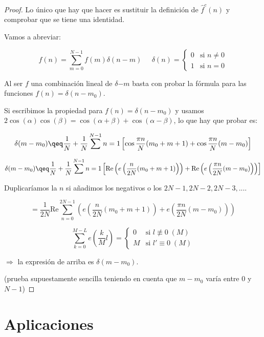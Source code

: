 	\begin{proof}
		Lo único que hay que hacer es sustituir la definición de $\hat{f}^c (n)$ y comprobar que se tiene una identidad.

		Vamos a abreviar:

		$$f(n) = \sum\limits^{N-1}_{m=0} f(m) \delta(n - m) \;\;\;\;\; \delta(n) = \begin{cases}
			0 & \mbox{si } n \neq 0 \\
			1 & \mbox{si } n = 0
		\end{cases}$$

		Al ser $f $ una combinación lineal de $\delta{-m}$ basta con probar la fórmula para las funciones $f(n) = \delta(n- m_0)$.

		Si escribimos la propiedad para $f(n) = \delta(n - m_0)$ y usamos $2 \cos{(\alpha)} \cos{(\beta)} = \cos{(\alpha + \beta)} + \cos{(\alpha - \beta)}$, lo que hay que probar es:

		$$ \delta(m - m_0) \qeq \frac{1}{N} + \frac{1}{N} \sum\limits^{N-1}{n = 1} \left[ \cos{\frac{\pi n}{N} (m_0 + m + 1)} + \cos{\frac{\pi n}{N} (m - m_0)}   \right] $$

		$$ \delta(m - m_0) \qeq \frac{1}{N} + \frac{1}{N} \sum\limits^{N-1}{n = 1} \left[ \text{Re} \left( e \left( \frac{n}{2N} (m_0 + m + 1) \right) \right) + \text{Re} \left( e \left( \frac{\pi n}{2N} (m - m_0) \right) \right)   \right] $$

		Duplicaríamos la $n$ si añadimos los negativos o los $2N-1, 2N-2, 2N-3,...$.

		$$ = \frac{1}{2N} \text{Re} \sum\limits^{2N-1}_{n=0} \left( e \left( \frac{n}{2N} (m_0 + m + 1) \right) + e \left( \frac{\pi n}{2N} (m - m_0) \right) \right) $$

		$$ \sum\limits^{M - L}_{k = 0} e \left( \frac{k}{M} l \right) = \begin{cases}
			0 & \mbox{si } l \not\equiv 0 \; (M) \\
			M & \mbox{si } l' \equiv 0 \; (M)
		\end{cases}$$

		$\Rightarrow$ la expresión de arriba es $\delta(m - m_0).$

		(prueba supuestamente sencilla teniendo en cuenta que $m-m_0$ varía entre 0 y $N-1$)

	\end{proof}


\section{Aplicaciones}

